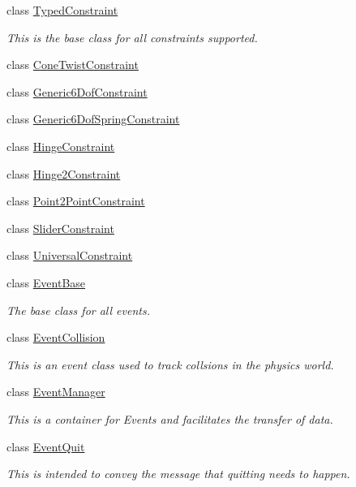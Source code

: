 \begin{DoxyCompactItemize}
class \hyperlink{classphys_1_1TypedConstraint}{TypedConstraint}
\begin{DoxyCompactList}\small\item\em This is the base class for all constraints supported. \item\end{DoxyCompactList}\item 
class \hyperlink{classphys_1_1ConeTwistConstraint}{ConeTwistConstraint}
\item 
class \hyperlink{classphys_1_1Generic6DofConstraint}{Generic6DofConstraint}
\item 
class \hyperlink{classphys_1_1Generic6DofSpringConstraint}{Generic6DofSpringConstraint}
\item 
class \hyperlink{classphys_1_1HingeConstraint}{HingeConstraint}
\item 
class \hyperlink{classphys_1_1Hinge2Constraint}{Hinge2Constraint}
\item 
class \hyperlink{classphys_1_1Point2PointConstraint}{Point2PointConstraint}
\item 
class \hyperlink{classphys_1_1SliderConstraint}{SliderConstraint}
\item 
class \hyperlink{classphys_1_1UniversalConstraint}{UniversalConstraint}
\item 
class \hyperlink{classphys_1_1EventBase}{EventBase}
\begin{DoxyCompactList}\small\item\em The base class for all events. \item\end{DoxyCompactList}\item 
class \hyperlink{classphys_1_1EventCollision}{EventCollision}
\begin{DoxyCompactList}\small\item\em This is an event class used to track collsions in the physics world. \item\end{DoxyCompactList}\item 
class \hyperlink{classphys_1_1EventManager}{EventManager}
\begin{DoxyCompactList}\small\item\em This is a container for Events and facilitates the transfer of data. \item\end{DoxyCompactList}\item 
class \hyperlink{classphys_1_1EventQuit}{EventQuit}
\begin{DoxyCompactList}\small\item\em This is intended to convey the message that quitting needs to happen. \item\end{DoxyCompactList}\item 

\end{DoxyCompactItemize}
